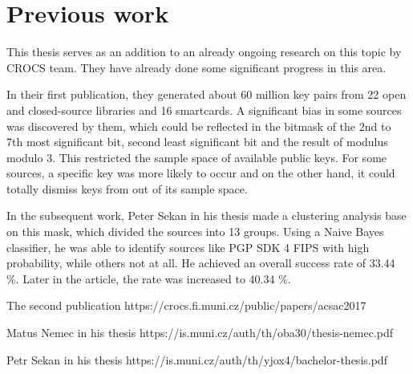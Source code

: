 \chapter{Previous work}

This thesis serves as an addition to an already ongoing research on this topic by CROCS team. They have already done some significant progress in this area. 

In their first publication\cite{svenda_1}, they generated about 60 million key pairs from 22 open and closed-source libraries and 16 smartcards. A significant bias in some sources was discovered by them, which could be reflected in the bitmask of the 2nd to 7th most significant bit, second least significant bit and the result of modulus modulo 3. This restricted the sample space of available public keys. For some sources, a specific key was more likely to occur and on the other hand, it could totally dismiss keys from out of its sample space.

In the subsequent work, Peter Sekan in his thesis\cite{thesis_sekan} made a clustering analysis base on this mask, which divided the sources into 13 groups. Using a Naive Bayes classifier, he was able to identify sources like PGP SDK 4 FIPS with high probability, while others not at all. He achieved an overall success rate of 33.44 \%. Later in the article, the rate was increased to 40.34 \%.

The second publication https://crocs.fi.muni.cz/public/papers/acsac2017

Matus Nemec in his thesis https://is.muni.cz/auth/th/oba30/thesis-nemec.pdf

Petr Sekan in his thesis https://is.muni.cz/auth/th/yjox4/bachelor-thesis.pdf